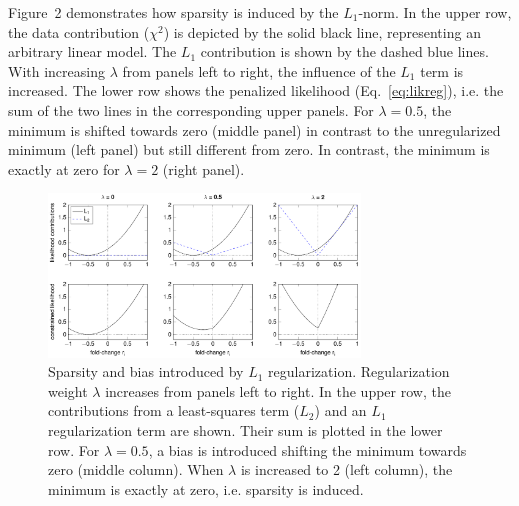 \documentclass{bioinfo}
\begin{document}
Figure~2\vphantom{\ref{fig:02}} demonstrates how sparsity is induced by the $L_1$-norm.
In the upper row, the data contribution ($\chi^2$) is depicted by the solid black line, representing an arbitrary linear model.
The $L_1$ contribution is shown by the dashed blue lines.
With increasing $\lambda$ from panels left to right, the influence of the $L_1$ term is increased.
The lower row shows the penalized likelihood (Eq.~\ref{eq:likreg}), i.e. the sum of the two lines in the corresponding upper panels.
For $\lambda=0.5$, the minimum is shifted towards zero (middle panel) in contrast to the unregularized minimum (left panel) but still different from zero.
In contrast, the minimum is exactly at zero for $\lambda=2$ (right panel).

\begin{figure}[!tpb]%
\centerline{\includegraphics[width=235pt]{Figures/l1_cartoon_priorstrength.pdf}}
\caption{Sparsity and bias introduced by $L_1$ regularization. Regularization weight $\lambda$ increases from panels left to right. In the upper row, the contributions from a least-squares term ($L_2$) and an $L_1$ regularization term are shown. Their sum is plotted in the lower row. For $\lambda=0.5$, a bias is introduced shifting the minimum towards zero (middle column). When $\lambda$ is increased to 2 (left column), the minimum is exactly at zero, i.e. sparsity is induced.}\label{fig:02}
\end{figure}
\end{document}
